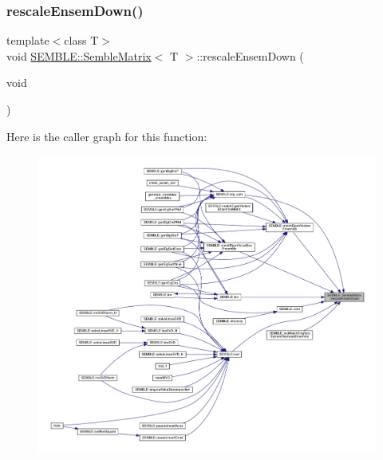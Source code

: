 \subsubsection{\texorpdfstring{rescaleEnsemDown()}{rescaleEnsemDown()}\hspace{0.1cm}{\footnotesize\ttfamily [2/2]}}
{\footnotesize\ttfamily template$<$class T$>$ \\
void \mbox{\hyperlink{structSEMBLE_1_1SembleMatrix}{S\+E\+M\+B\+L\+E\+::\+Semble\+Matrix}}$<$ T $>$\+::rescale\+Ensem\+Down (\begin{DoxyParamCaption}\item[{void}]{ }\end{DoxyParamCaption})\hspace{0.3cm}{\ttfamily [inline]}}

Here is the caller graph for this function\+:
\nopagebreak
\begin{figure}[H]
\begin{center}
\leavevmode
\includegraphics[width=350pt]{df/d87/structSEMBLE_1_1SembleMatrix_a8073a3547ac8aa58aa4c76a11328d776_icgraph}
\end{center}
\end{figure}
\mbox{\label{structSEMBLE_1_1SembleMatrix_a6c6da8677941f6422d30c582f6fd87c0}} 
